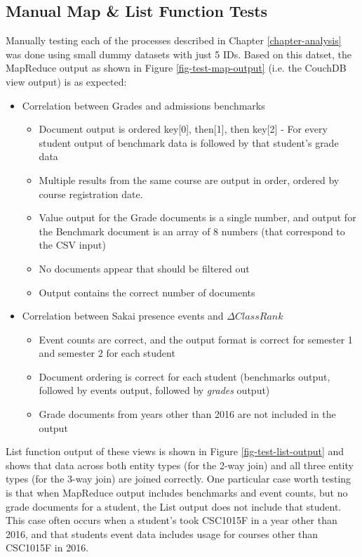 \subsection{Manual Map \& List Function Tests}
Manually testing each of the processes described in Chapter \ref{chapter-analysis} was done using small dummy datasets with just 5 IDs. Based on this datset, the MapReduce output as shown in Figure \ref{fig-test-map-output} (i.e. the CouchDB view output) is as expected:

\begin{itemize}
  \item Correlation between Grades and admissions benchmarks
        \begin{itemize}
          \item Document output is ordered key[0], then[1], then key[2] - For every student output of benchmark data is followed by that student's grade data
          \item Multiple results from the same course are output in order, ordered by course registration date.
          \item Value output for the Grade documents is a single number, and output for the Benchmark document is an array of 8 numbers (that correspond to the CSV input)
          \item No documents appear that should be filtered out
          \item Output contains the correct number of documents
        \end{itemize}
  \item Correlation between Sakai presence events and $\Delta ClassRank$
        \begin{itemize}
          \item Event counts are correct, and the output format is correct for semester 1 and semester 2 for each student
          \item Document ordering is correct for each student (benchmarks output, followed by events output, followed by \textit{grades} output)
          \item Grade documents from years other than 2016 are not included in the output
        \end{itemize}
\end{itemize}

List function output of these views is shown in Figure \ref{fig-test-list-output} and shows that data across both entity types (for the 2-way join) and all three entity types (for the 3-way join) are joined correctly. One particular case worth testing is that when MapReduce output includes benchmarks and event counts, but no grade documents for a student, the List output does not include that student. This case often occurs when a student's took CSC1015F in a year other than 2016, and that students event data includes usage for courses other than CSC1015F in 2016.

